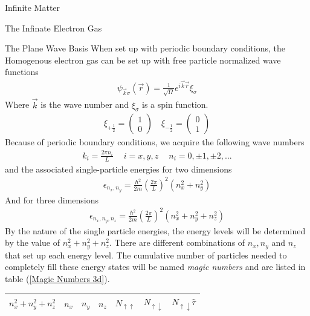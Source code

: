 \documentclass[twoside,english]{uiofysmaster}
\begin{document}
\begin{chapter}{Infinite Matter}
\begin{section}{The Infinate Electron Gas}
		\begin{subsection}{The Plane Wave Basis}
			When set up with periodic boundary conditions, the Homogenous electron gas can be set up with free particle normalized wave functions
			\begin{align}
				\psi_{\vec k \sigma} (\vec r) = \frac{1}{\sqrt{\Omega}} e^{i \vec k \vec r} \xi_{\sigma}
			\end{align}
			Where $\vec k$ is the wave number and $\xi_{\sigma}$ is a spin function. 
			\begin{align}
				\xi_{+\frac{1}{2}} = \left( \begin{matrix} 1 \\ 0 \end{matrix} \right) \:\;\:\; \xi_{-\frac{1}{2}} = \left( \begin{matrix} 0 \\ 1 \end{matrix} \right)
			\end{align}
			Because of periodic boundary conditions, we acquire the following wave numbers
			\begin{align}
				k_i = \frac{2\pi n_i}{L} \:\:\:\;\; i = x,y,z \;\;\:\:\: n_i = 0, \pm 1, \pm 2, ...
			\end{align}
			and the associated single-particle energies for two dimensions
			\begin{align}
				\epsilon_{n_x,n_y} = \frac{\hbar^2}{2m} \left( \frac{2\pi}{L} \right)^2 (n_x^2 + n_y^2)
			\end{align}
			And for three dimensions
			\begin{align}
				\epsilon_{n_x,n_y,n_z} = \frac{\hbar^2}{2m} \left( \frac{2\pi}{L} \right)^2 (n_x^2 + n_y^2 + n_z^2 )
			\end{align}
			By the nature of the single particle energies, the energy levels will be determined by the value of $n_x^2 + n_y^2 + n_z^2$. There are different combinations of $n_x, n_y$ and $n_z$ that set up each energy level. The cumulative number of particles needed to completely fill these energy states will be named \textit{magic numbers} and are listed in table (\ref{Magic Numbers 3d}). 
			\begin{table}[H]
				\begin{center}
					\begin{tabular}[center]{l | c c c | c | c | r }
						$n_x^2 + n_y^2 + n_z^2$ & $n_x$ & $n_y$ & $n_z$ & $N_{\uparrow \uparrow}$ & $N_{\uparrow \downarrow}$ & $N_{\uparrow \downarrow} \hat \tau$ \\
						\hline

\end{tabular}
\end{center}
\end{table}
\end{subsection}
\end{section}
\end{chapter}
\end{document}
